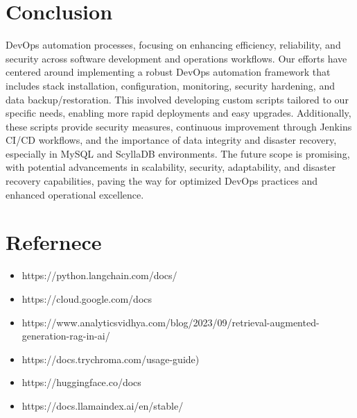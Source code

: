 \documentclass[12pt,a4paper,oneside]{report}
\begin{document}
\newpage
\chapter{Conclusion}
\hspace{20pt}  DevOps automation processes, focusing on enhancing efficiency, reliability, and security across software development and operations workflows. Our efforts have centered around implementing a robust DevOps automation framework that includes stack installation, configuration, monitoring, security hardening, and data backup/restoration. This involved developing custom scripts tailored to our specific needs, enabling more rapid deployments and easy upgrades. Additionally, these scripts provide security measures, continuous improvement through Jenkins CI/CD workflows, and the importance of data integrity and disaster recovery, especially in MySQL and ScyllaDB environments. The future scope is promising, with potential advancements in scalability, security, adaptability, and disaster recovery capabilities, paving the way for optimized DevOps practices and enhanced operational excellence.

\newpage
\chapter{Refernece}
\begin{itemize}
\item{https://python.langchain.com/docs/}
\item{https://cloud.google.com/docs}
\item{https://www.analyticsvidhya.com/blog/2023/09/retrieval-augmented-generation-rag-in-ai/}
\item{https://docs.trychroma.com/usage-guide)}
\item{https://huggingface.co/docs}
\item{https://docs.llamaindex.ai/en/stable/}
\end{itemize}
\end{document}
